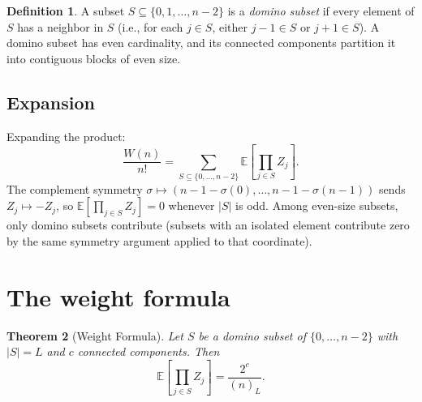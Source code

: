 \documentclass[11pt]{amsart}
\newtheorem{theorem}{Theorem}[section]
\theoremstyle{definition}
\newtheorem{definition}[theorem]{Definition}
\begin{document}
\begin{definition}
A subset $S \subseteq \{0,1,\ldots,n-2\}$ is a \emph{domino subset} if every element of $S$ has a neighbor in $S$ (i.e., for each $j \in S$, either $j-1 \in S$ or $j+1 \in S$). A domino subset has even cardinality, and its connected components partition it into contiguous blocks of even size.
\end{definition}

\subsection{Expansion}

Expanding the product:
\[
\frac{W(n)}{n!} = \sum_{S \subseteq \{0,\ldots,n-2\}} \mathbb{E}\left[\prod_{j \in S} Z_j\right].
\]
The complement symmetry $\sigma \mapsto (n-1-\sigma(0), \ldots, n-1-\sigma(n-1))$ sends $Z_j \mapsto -Z_j$, so $\mathbb{E}[\prod_{j \in S} Z_j] = 0$ whenever $|S|$ is odd. Among even-size subsets, only domino subsets contribute (subsets with an isolated element contribute zero by the same symmetry argument applied to that coordinate).

\section{The weight formula}

\begin{theorem}[Weight Formula]\label{thm:weight}
Let $S$ be a domino subset of $\{0,\ldots,n-2\}$ with $|S| = L$ and $c$ connected components. Then
\[
\mathbb{E}\left[\prod_{j \in S} Z_j\right] = \frac{2^c}{(n)_L}.
\]
\end{theorem}
\end{document}
